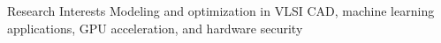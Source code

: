 
\begin{rSection}{Research Interests}
    Modeling and optimization in VLSI CAD, machine learning applications, GPU acceleration, and hardware security 
\end{rSection}

